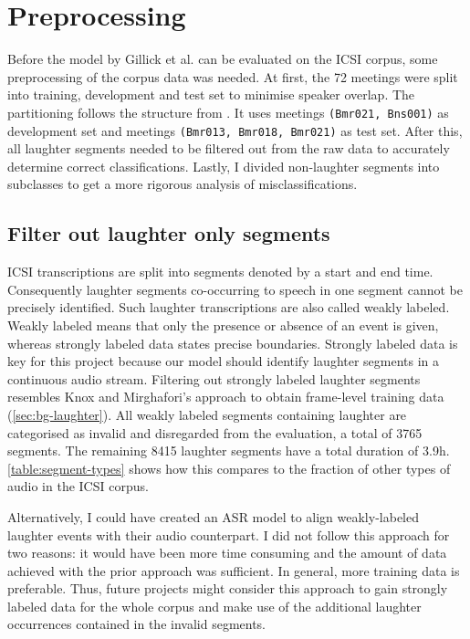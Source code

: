 \documentclass[bsc,frontabs,parskip,deptreport]{infthesis}
\begin{document}
\section{Preprocessing} \label{sec:preprocessing}
Before the model by Gillick et al. can be evaluated on the ICSI corpus, some preprocessing of the corpus data was needed.
At first, the 72 meetings were split into training, development and test set to minimise speaker overlap. The partitioning follows the structure from \citet{renals2014neural}. It uses meetings \texttt{(Bmr021, Bns001)} as development set and meetings \texttt{(Bmr013, Bmr018, Bmr021)} as test set.
After this, all laughter segments needed to be filtered out from the raw data to accurately determine correct classifications. 
Lastly, I divided non-laughter segments into subclasses to get a more rigorous analysis of misclassifications.

\subsection{Filter out laughter only segments} \label{subsec:filter-laughter}
ICSI transcriptions are split into segments denoted by a start and end time.
Consequently laughter segments co-occurring to speech in one segment cannot be precisely identified.
Such laughter transcriptions are also called weakly labeled. Weakly labeled means that only the presence or absence of an event is given, whereas strongly labeled data states precise boundaries.
Strongly labeled data is key for this project because our model should identify laughter segments in a continuous audio stream.
Filtering out strongly labeled laughter segments resembles Knox and Mirghafori's approach to obtain frame-level training data \citep{knox2006automatic} (\autoref{sec:bg-laughter}). 
All weakly labeled segments containing laughter are categorised as invalid and disregarded from the evaluation, a total of 3765 segments.
The remaining 8415 laughter segments have a total duration of 3.9h. \autoref{table:segment-types} shows how this compares to the fraction of other types of audio in the ICSI corpus.

Alternatively, I could have created an ASR model to align weakly-labeled laughter events with their audio counterpart. 
I did not follow this approach for two reasons: it would have been more time consuming and the amount of data achieved with the prior approach was sufficient. 
In general, more training data is preferable. Thus, future projects might consider this approach to gain strongly labeled data for the whole corpus and make use of the additional laughter occurrences contained in the invalid segments. 
\end{document}
